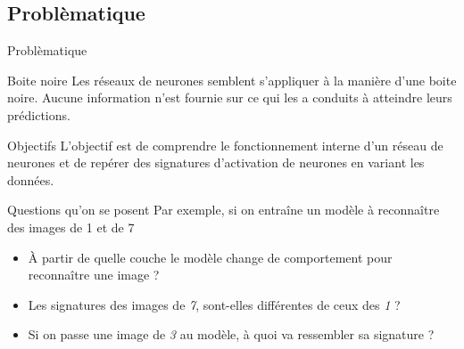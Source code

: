 \documentclass[10pt,handout]{beamer}
\newif\ifplacelogo %
\begin{document}
\placelogofalse 
\subsection{Problèmatique}
\begin{frame}{Problèmatique}
    \begin{block}{Boite noire}
        Les réseaux de neurones semblent s'appliquer à la manière d'une boite noire. Aucune information n'est fournie sur ce qui les a conduits à atteindre leurs prédictions.
    \end{block}
    \begin{block}{Objectifs}
        L'objectif est de comprendre le fonctionnement interne d'un réseau de neurones et de repérer des signatures d'activation de neurones en variant les données.
    \end{block}

        
\end{frame}
\placelogotrue

\begin{frame}{Questions qu'on se posent}
    Par exemple, si on entraîne un modèle à reconnaître des images de 1 et de 7
    \begin{itemize}
        \item À partir de quelle couche le modèle change de comportement pour reconnaître une image ?
        \item Les signatures des images de \textit{7}, sont-elles différentes de ceux des \textit{1} ?
        \item Si on passe une image de \textit{3} au modèle, à quoi va ressembler sa signature ?
    \end{itemize}    
\end{frame}
\end{document}
